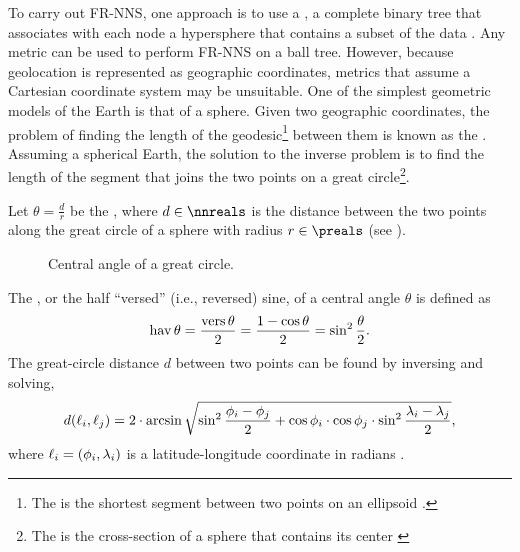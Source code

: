 To carry out FR-NNS, one approach is to use a , a complete binary tree that associates with each node a hypersphere that contains a subset of the data \citep{Omohundro1989, Neeraj2008, Kibriya2007}. Any metric can be used to perform FR-NNS on a ball tree. However, because geolocation is represented as geographic coordinates, metrics that assume a Cartesian coordinate system may be unsuitable. One of the simplest geometric models of the Earth is that of a sphere. Given two geographic coordinates, the problem of finding the length of the geodesic\footnote{The  is the shortest segment between two points on an ellipsoid \citep{Lu2014}.} between them is known as the  \citep{Sjoberg2012}. Assuming a spherical Earth, the solution to the inverse problem is to find the length of the segment that joins the two points on a great circle\footnote{The  is the cross-section of a sphere that contains its center \citep{Lu2014}}.

Let $\theta = \frac{d}{r}$ be the , where $d \in \nnreals$ is the distance between the two points along the great circle of a sphere with radius $r \in \preals$ (see ).

\begin{figure}[htbp]
\centering
{}
\caption[Central angle of a great circle]{Central angle of a great circle.}
\label{fig:central-angle}
\end{figure}

The , or the half ``versed'' (i.e., reversed) sine, of a central angle $\theta$ is defined as
\begin{equation}
  \operatorname{hav} \theta = \frac{\operatorname{vers} \theta}{2}  = \frac{1 - \cos \theta}{2}= \sin^2 \frac{\theta}{2}. \label{eq:hav}
\end{equation}
The great-circle distance $d$ between two points can be found by inversing  and solving,
\begin{equation*}
  d(\ell_i, \ell_j) = 2 \cdot \arcsin \sqrt{\sin^2 \frac{\phi_i - \phi_j}{2} + \cos \phi_i \cdot \cos\phi_j \cdot \sin^2 \frac{\lambda_i - \lambda_j}{2}},
\end{equation*}
where $\ell_i = (\phi_i, \lambda_i)$ is a latitude-longitude coordinate in radians \cite[pp. 157--162]{Brummelen2013}.

